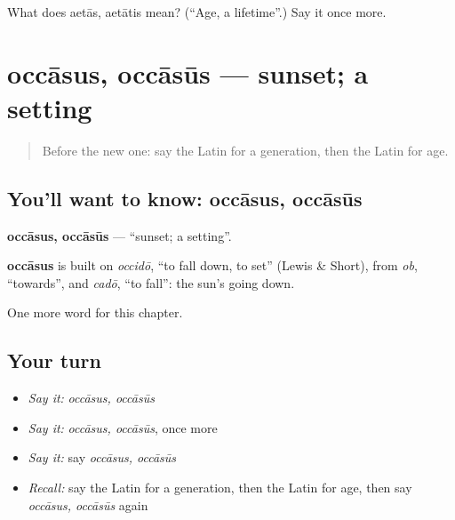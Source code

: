 \begin{tcolorbox}[breakable,colback=teal!4,colframe=teal!35!black,title={Before you move on}]
What does aetās, aetātis mean? (\textquotedblleft{}Age, a lifetime\textquotedblright{}.) Say it once more.
\end{tcolorbox}
\section[occāsus, occāsūs]{occāsus, occāsūs — sunset; a setting}

\label{lesson:LA-C207-occasus}



\begin{quote}
Before the new one: say the Latin for a generation, then the Latin for age.
\end{quote}

\subsection*{You'll want to know: occāsus, occāsūs}
\textbf{occāsus, occāsūs} — \textquotedblleft{}sunset; a setting\textquotedblright{}.

\begin{cousinweb}
\textbf{occāsus} is built on \emph{occidō}, \textquotedblleft{}to fall down, to set\textquotedblright{} (Lewis \& Short), from \emph{ob}, \textquotedblleft{}towards\textquotedblright{}, and \emph{cadō}, \textquotedblleft{}to fall\textquotedblright{}: the sun's going down.
\end{cousinweb}

\begin{grammarlens}[title={What you've built}]
One more word for this chapter.
\end{grammarlens}

\subsection*{Your turn}
\begin{itemize}
\raggedright
  \item \emph{Say it:} \emph{occāsus, occāsūs}
  \item \emph{Say it:} \emph{occāsus, occāsūs}, once more
  \item \emph{Say it:} say \emph{occāsus, occāsūs}
  \item \emph{Recall:} say the Latin for a generation, then the Latin for age, then say \emph{occāsus, occāsūs} again
\end{itemize}

